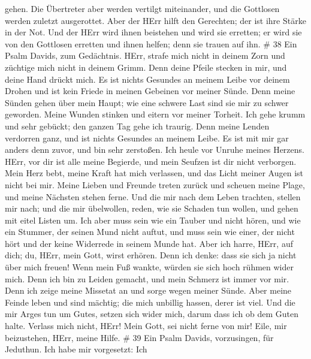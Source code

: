 gehen.  Die Übertreter aber werden vertilgt miteinander,
und die Gottlosen werden zuletzt ausgerottet.  Aber der
HErr hilft den Gerechten; der ist ihre Stärke in der Not. 
Und der HErr wird ihnen beistehen und wird sie erretten; er wird sie von
den Gottlosen erretten und ihnen helfen; denn sie trauen auf ihn. \# 38
 Ein Psalm Davids, zum Gedächtnis.  HErr, strafe
mich nicht in deinem Zorn und züchtige mich nicht in deinem Grimm.
 Denn deine Pfeile stecken in mir, und deine Hand drückt
mich.  Es ist nichts Gesundes an meinem Leibe vor deinem
Drohen und ist kein Friede in meinen Gebeinen vor meiner Sünde.
 Denn meine Sünden gehen über mein Haupt; wie eine schwere
Last sind sie mir zu schwer geworden.  Meine Wunden stinken
und eitern vor meiner Torheit.  Ich gehe krumm und sehr
gebückt; den ganzen Tag gehe ich traurig.  Denn meine Lenden
verdorren ganz, und ist nichts Gesundes an meinem Leibe.  Es
ist mit mir gar anders denn zuvor, und bin sehr zerstoßen. Ich heule vor
Unruhe meines Herzens.  HErr, vor dir ist alle meine
Begierde, und mein Seufzen ist dir nicht verborgen.  Mein
Herz bebt, meine Kraft hat mich verlassen, und das Licht meiner Augen
ist nicht bei mir.  Meine Lieben und Freunde treten zurück
und scheuen meine Plage, und meine Nächsten stehen ferne. 
Und die mir nach dem Leben trachten, stellen mir nach; und die mir
übelwollen, reden, wie sie Schaden tun wollen, und gehen mit eitel
Listen um.  Ich aber muss sein wie ein Tauber und nicht
hören, und wie ein Stummer, der seinen Mund nicht auftut, 
und muss sein wie einer, der nicht hört und der keine Widerrede in
seinem Munde hat.  Aber ich harre, HErr, auf dich; du,
HErr, mein Gott, wirst erhören.  Denn ich denke: dass sie
sich ja nicht über mich freuen! Wenn mein Fuß wankte, würden sie sich
hoch rühmen wider mich.  Denn ich bin zu Leiden gemacht,
und mein Schmerz ist immer vor mir.  Denn ich zeige meine
Missetat an und sorge wegen meiner Sünde.  Aber meine
Feinde leben und sind mächtig; die mich unbillig hassen, derer ist viel.
 Und die mir Arges tun um Gutes, setzen sich wider mich,
darum dass ich ob dem Guten halte.  Verlass mich nicht,
HErr! Mein Gott, sei nicht ferne von mir!  Eile, mir
beizustehen, HErr, meine Hilfe. \# 39  Ein Psalm Davids,
vorzusingen, für Jeduthun.  Ich habe mir vorgesetzt: Ich
